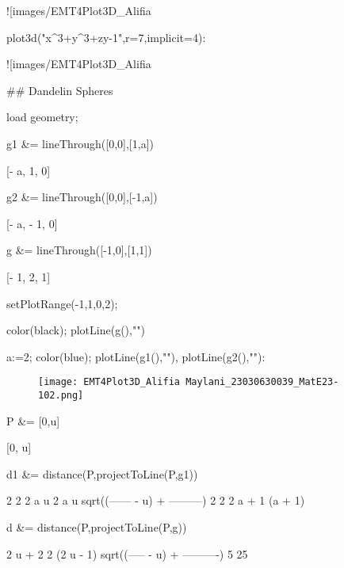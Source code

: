 \documentclass{article}
\begin{document}
![images/EMT4Plot3D_Alifia%

\>plot3d("x^3+y^3+z\*y-1",r=7,implicit=4):


![images/EMT4Plot3D_Alifia%

## Dandelin Spheres

\>load geometry;

\>g1 &= lineThrough([0,0],[1,a])


    
                                 [- a, 1, 0]
    

\>g2 &= lineThrough([0,0],[-1,a])


    
                                [- a, - 1, 0]
    

\>g &= lineThrough([-1,0],[1,1])


    
                                 [- 1, 2, 1]
    

\>setPlotRange(-1,1,0,2);

\>color(black); plotLine(g(),"")

\>a:=2; color(blue); plotLine(g1(),""), plotLine(g2(),""):


\begin{figure}
    \centering
    \texttt{[image: EMT4Plot3D\_Alifia Maylani\_23030630039\_MatE23-102.png]}
    \caption{}
    \label{fig:enter-label}
\end{figure}

\>P &= [0,u]


    
                                    [0, u]
    

\>d1 &= distance(P,projectToLine(P,g1))


    
                               2               2  2
                              a  u      2     a  u
                       sqrt((------ - u)  + ---------)
                              2               2     2
                             a  + 1         (a  + 1)
    

\>d &= distance(P,projectToLine(P,g))


    
                                                    2
                             u + 2     2   (2 u - 1)
                       sqrt((----- - u)  + ----------)
                               5               25
    
\end{document}
